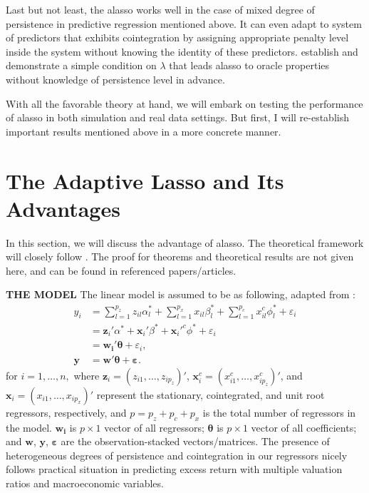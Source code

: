 \documentclass[12pt,a4paper]{article}
\begin{document}
Last but not least, the alasso works well in the case of mixed degree of persistence in predictive regression mentioned above. It can even adapt to system of predictors that exhibits cointegration by assigning appropriate penalty level inside the system without knowing the identity of these predictors. \cite{lee2018lasso} establish and demonstrate a simple condition on $\lambda$ that leads alasso to oracle properties without knowledge of persistence level in advance.

With all the favorable theory at hand, we will embark on testing the performance of alasso in both simulation and real data settings. But first, I will re-establish important results mentioned above in a more concrete manner.

\section{The Adaptive Lasso and Its Advantages}
In this section, we will discuss the advantage of alasso. The theoretical framework will closely follow \cite{tibshirani1996regression, knight2008shrinkage, zou2006adaptive, lee2018lasso}. The proof for theorems and theoretical results are not given here, and can be found in referenced papers/articles. 

\textbf{THE MODEL}
The linear model is assumed to be as following, adapted from \cite{lee2018lasso}: \begin{equation}\label{eq:1}
\begin{aligned}
	y_i & = \sum_{l=1}^{p_z}z_{il}\alpha_{l}^{*} + 
	\sum_{l=1}^{p_x}x_{il}\beta_{l}^{*} + 
	\sum_{l=1}^{p_c}x_{il}^c\phi_{l}^{*} +
	\varepsilon_i \\
		& = \bm{z}_i'\alpha^* + 
		\bm{x}_i'\beta^* + 
		\bm{x}_i'^c\phi^* + \varepsilon_i \\
		& = \bm{w_i}'\bm{\theta} + \varepsilon_i, \\
	\bm{y} & = \bm{w}'\bm{\theta} + \bm{\varepsilon}.
\end{aligned}
\end{equation}
for $ i = 1,\ldots, n, $ where $ \bm{z}_i = (z_{i1}, \ldots, z_{ip_z})' $, $ \bm{x}^c_i = (x^c_{i1}, \ldots, x^c_{ip_z})' $, and $ \bm{x}_i = (x_{i1}, \ldots, x_{ip_x})' $ represent the stationary, cointegrated, and unit root regressors, respectively, and $p = p_z + p_c + p_x$ is the total number of regressors in the model. $\bm{w_i}$ is $ p \times 1 $ vector of all regressors; $\bm{\theta}$ is $p \times 1$  vector of all coefficients; and $ \bm{w} $, $ \bm{y} $, $ \bm{\varepsilon} $ are the observation-stacked vectors/matrices.  The presence of heterogeneous degrees of persistence and cointegration in our regressors nicely follows practical situation in predicting excess return with multiple valuation ratios and macroeconomic variables.
\end{document}
